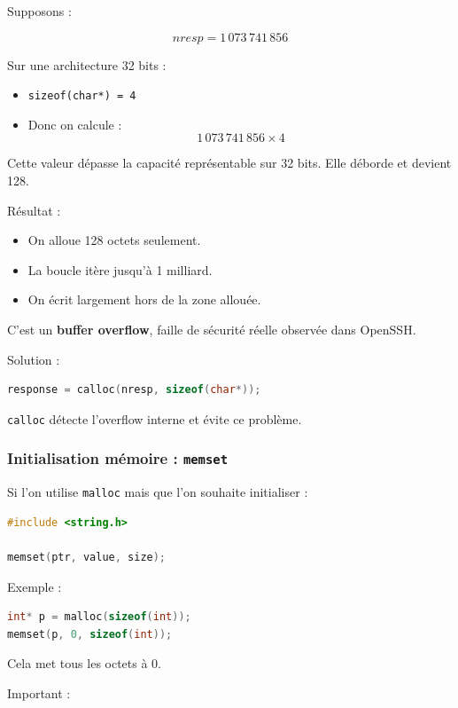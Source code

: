 Supposons :

\[
nresp = 1\,073\,741\,856
\]

Sur une architecture 32 bits :

\begin{itemize}
    \item \texttt{sizeof(char*) = 4}
    \item Donc on calcule :
    \[
    1\,073\,741\,856 \times 4
    \]
\end{itemize}

Cette valeur dépasse la capacité représentable sur 32 bits.
Elle déborde et devient 128.

Résultat :

\begin{itemize}
    \item On alloue 128 octets seulement.
    \item La boucle itère jusqu’à 1 milliard.
    \item On écrit largement hors de la zone allouée.
\end{itemize}

C’est un \textbf{buffer overflow}, faille de sécurité réelle observée dans OpenSSH.

Solution :

\begin{lstlisting}[language=C]
response = calloc(nresp, sizeof(char*));
\end{lstlisting}

\texttt{calloc} détecte l’overflow interne et évite ce problème.

\subsubsection{Initialisation mémoire : \texttt{memset}}

Si l’on utilise \texttt{malloc} mais que l’on souhaite initialiser :

\begin{lstlisting}[language=C]
#include <string.h>

memset(ptr, value, size);
\end{lstlisting}

Exemple :

\begin{lstlisting}[language=C]
int* p = malloc(sizeof(int));
memset(p, 0, sizeof(int));
\end{lstlisting}

Cela met tous les octets à 0.

Important :

